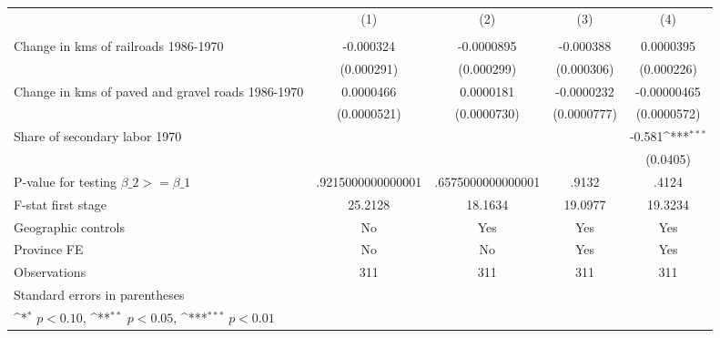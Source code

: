 {
\def\sym#1{\ifmmode^{#1}\else\(^{#1}\)\fi}
\begin{tabular}{l*{4}{c}}
\hline\hline
                &\multicolumn{1}{c}{(1)}&\multicolumn{1}{c}{(2)}&\multicolumn{1}{c}{(3)}&\multicolumn{1}{c}{(4)}\\
                &\multicolumn{1}{c}{}&\multicolumn{1}{c}{}&\multicolumn{1}{c}{}&\multicolumn{1}{c}{}\\
\hline
Change in kms of railroads 1986-1970&-0.000324         &-0.0000895         &-0.000388         &0.0000395         \\
                &(0.000291)         &(0.000299)         &(0.000306)         &(0.000226)         \\
[1em]
Change in kms of paved and gravel roads 1986-1970&0.0000466         &0.0000181         &-0.0000232         &-0.00000465         \\
                &(0.0000521)         &(0.0000730)         &(0.0000777)         &(0.0000572)         \\
[1em]
Share of secondary labor 1970&                  &                  &                  &   -0.581\sym{***}\\
                &                  &                  &                  & (0.0405)         \\
\hline
P-value for testing $\beta\_{2} >= \beta\_{1}$&.9215000000000001         &.6575000000000001         &    .9132         &    .4124         \\
F-stat first stage&  25.2128         &  18.1634         &  19.0977         &  19.3234         \\
Geographic controls&       No         &      Yes         &      Yes         &      Yes         \\
Province FE     &       No         &       No         &      Yes         &      Yes         \\
Observations    &      311         &      311         &      311         &      311         \\
\hline\hline
\multicolumn{5}{l}{\footnotesize Standard errors in parentheses}\\
\multicolumn{5}{l}{\footnotesize \sym{*} \(p<0.10\), \sym{**} \(p<0.05\), \sym{***} \(p<0.01\)}\\
\end{tabular}
}
